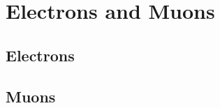 \section{Electrons and Muons}
\label{sec:leptons}

\subsection{Electrons}
\label{sec:electrons}

\subsection{Muons}
\label{sec:muons}
